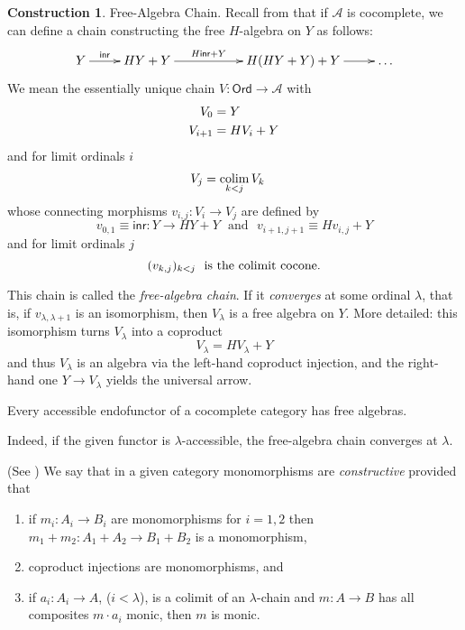 \documentclass{LMCS}
\newcommand{\takeout}[1]{\empty}
\theoremstyle{plain}
\theoremstyle{definition}
\newtheorem{construction}[theorem]{Construction}
\numberwithin{equation}{section}
\def\colim{\mathop{\mathrm{colim}}}
\begin{document}
\takeout{
\begin{exa}\label{set functor}
Every set functor with a free Bloom algebra has a terminal coalgebra. The condition {\bf Set}$(Y, HY)\neq \emptyset$ is here automatically satisfied except when $H$ is constantly $\emptyset$.
\end{exa}
}

\begin{construction}\label{free chain} Free-Algebra Chain.
Recall from \cite{a} that if $\mathcal A$ is cocomplete, we can define a chain constructing the free $H$-algebra on $Y$ as follows:
$$
\xymatrix{
Y\ar[r]^-{\mathsf{inr}}&HY+Y\ar[rr]^-{H\mathsf{inr}+Y}&&H(HY+Y)+Y\ar[r]^{}&\ldots
}
$$
We mean the essentially unique chain $V:\mathsf{Ord}\rightarrow \mathcal A$ with
\begin{align}
V_0&=Y\notag\\
V_{i+1}&=HV_i+Y\notag
\end{align}
and for limit ordinals $i$
\begin{align}
V_j&=\colim_{k<j}V_k\notag
\end{align}
whose connecting morphisms $v_{i,j}:V_i\rightarrow V_j$ are defined by
$$v_{0,1}\equiv \mathsf{inr}:Y\rightarrow HY+Y\ \ \ \text{and} \ \ \ v_{i+1,j+1}\equiv Hv_{i,j}+Y$$
and for limit ordinals $j$
$$(v_{k,j})_{k<j}\ \ {\rm is\ the \ colimit\ cocone.}$$

This chain is called the {\it free-algebra chain}. If it \emph{converges} at some ordinal $\lambda$, that is, if $v_{\lambda,\lambda+1}$ is an isomorphism, then $V_\lambda$ is a free algebra on $Y$. More detailed: this isomorphism turns $V_{\lambda}$ into a coproduct
$$V_\lambda=HV_\lambda+Y$$
and thus $V_\lambda$ is an algebra via the left-hand coproduct injection, and the right-hand one $Y\rightarrow V_\lambda$ yields the universal arrow.
\end{construction}

\begin{cor}\label{c-access}
Every accessible endofunctor of a cocomplete category has free algebras.
\end{cor}
Indeed, if the given functor is $\lambda$-accessible, the free-algebra chain converges at $\lambda$.

\begin{defi}(See \cite{at})
We say that in a given category monomorphisms are {\it constructive} provided that
\begin{enumerate}[label=\({\alph*}]
\item if $m_i:A_i\rightarrow B_i$ are monomorphisms for $i=1,2$ then $m_1+m_2:A_1+A_2\rightarrow B_1+B_2$ is a monomorphism,

\item coproduct injections are monomorphisms, and

\item if $a_i:A_i\rightarrow A$, ($i<\lambda$), is a colimit of an
  $\lambda$-chain and $m:A\rightarrow B$ has all composites $m\cdot
  a_i$ monic, then $m$ is monic.
\end{enumerate}
\end{defi}
\end{document}
